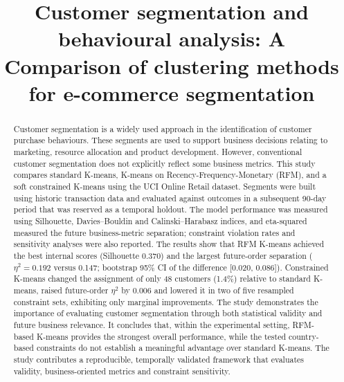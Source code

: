 \documentclass[conference,10pt]{IEEEtran}
\begin{document}
\title{Customer segmentation and behavioural analysis: A Comparison of
clustering methods for e-commerce segmentation}

\author{
}

\maketitle

\begin{abstract}
Customer segmentation is a widely used approach
in the identification of customer purchase behaviours. These
segments are used to support business decisions relating to
marketing, resource allocation and product development. However, conventional customer segmentation does not explicitly
reflect some business metrics. This study compares standard
K-means, K-means on Recency-Frequency-Monetary (RFM), and a
soft constrained K-means using the UCI Online Retail dataset.
Segments were built using historic transaction data and evaluated
against outcomes in a subsequent 90-day period that was reserved
as a temporal holdout. The model performance was measured
using Silhouette, Davies–Bouldin and Calinski–Harabasz indices,
and eta-squared measured the future business-metric separation; constraint violation rates and sensitivity analyses were also reported. The
results show that RFM K-means achieved the best internal
scores (Silhouette 0.370) and the largest future-order separation
($\eta^2 = 0.192$ versus 0.147; bootstrap 95\% CI of the difference
[0.020, 0.086]). Constrained K-means changed the assignment
of only 48 customers (1.4\%) relative to standard K-means,
raised future-order $\eta^2$ by 0.006 and lowered it in two of five
resampled constraint sets, exhibiting only marginal improvements.
The study demonstrates the importance of evaluating customer
segmentation through both statistical validity and future business
relevance. It concludes that, within the experimental setting,
RFM-based K-means provides the strongest overall performance,
while the tested country-based constraints do not establish
a meaningful advantage over standard K-means. The study
contributes a reproducible, temporally validated framework that
evaluates validity, business-oriented metrics and constraint
sensitivity.
\end{abstract}
\end{document}
